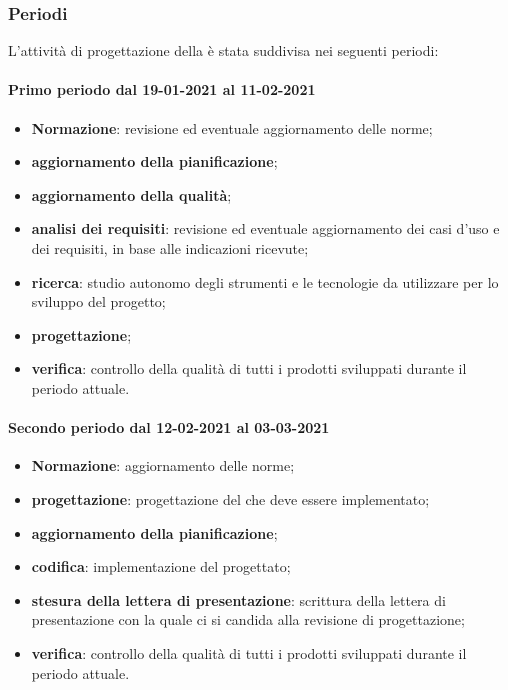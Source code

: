 \subsubsection{Periodi} 
L'attività di progettazione della  è stata suddivisa nei seguenti periodi: 

\paragraph{Primo periodo dal 19-01-2021 al 11-02-2021} 
\begin{itemize} 
	\item \textbf{Normazione}: revisione ed eventuale aggiornamento delle norme; 
	\item \textbf{aggiornamento della pianificazione}; 
	\item \textbf{aggiornamento della qualità}; 
	\item \textbf{analisi dei requisiti}: revisione ed eventuale aggiornamento dei casi d’uso e dei requisiti, in base alle indicazioni ricevute; 
	\item \textbf{ricerca}: studio autonomo degli strumenti e le tecnologie da utilizzare per lo sviluppo del 
	progetto; 
	\item \textbf{progettazione}; 
	\item \textbf{verifica}: controllo della qualità di tutti i prodotti sviluppati durante il periodo attuale. 
\end{itemize} 

\paragraph{Secondo periodo dal 12-02-2021 al 03-03-2021} 
\begin{itemize} 
	\item \textbf{Normazione}: aggiornamento delle norme; 
	\item \textbf{progettazione}: progettazione del  che deve essere implementato; 
	\item \textbf{aggiornamento della pianificazione}; 
	\item \textbf{codifica}: implementazione del  progettato; 
	\item \textbf{stesura della lettera di presentazione}: scrittura della lettera di presentazione con la quale ci 
	si candida alla revisione di progettazione; 
	\item \textbf{verifica}: controllo della qualità di tutti i prodotti sviluppati durante il periodo attuale. 
\end{itemize}	 

